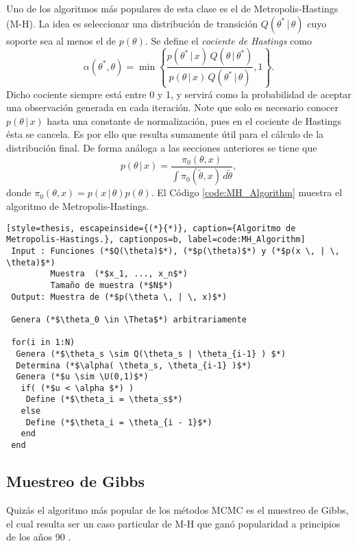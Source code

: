 Uno de los algoritmos más populares de esta clase es el de Metropolis-Hastings (M-H). La idea es seleccionar una distribución de transición $Q( \theta^* \, | \, \theta )$ cuyo soporte sea al menos el de $p(\theta)$. Se define el \textit{cociente de Hastings} como
\begin{equation} \label{eq:cociente_hastings}
	\alpha(\theta^*, \theta) = \min \left\{ \frac{ p(\theta^* \, | \, x) \, Q(\theta \, | \, \theta^*) }{ p(\theta \, | \, x) \, Q(\theta^* \, | \, \theta) }, 1 \right\}.
\end{equation}
Dicho cociente siempre está entre 0 y 1, y servirá como la probabilidad de aceptar una observación generada en cada iteración. Note que solo es necesario conocer $p(\theta \, | \, x)$ hasta una constante de normalización, pues en el cociente de Hastings ésta se cancela. Es por ello que resulta sumamente útil para el cálculo de la distribución final. De forma análoga a las secciones anteriores se tiene que
\begin{equation*}
	p(\theta \, | \, x) = \frac{ \pi_0(\theta, x) }{ \int \pi_0(\tilde{\theta}, x) \, d\tilde{\theta} },
\end{equation*}
donde $\pi_0(\theta, x) = p(x \, | \, \theta) p(\theta)$. El Código \ref{code:MH_Algorithm} muestra el algoritmo de Metropolis-Hastings.




\begin{lstlisting}[style=thesis, escapeinside={(*}{*)}, caption={Algoritmo de Metropolis-Hastings.}, captionpos=b, label=code:MH_Algorithm]
 Input : Funciones (*$Q(\theta)$*), (*$p(\theta)$*) y (*$p(x \, | \, \theta)$*)
         Muestra  (*$x_1, ..., x_n$*)
         Tamaño de muestra (*$N$*)
 Output: Muestra de (*$p(\theta \, | \, x)$*)
 
 Genera (*$\theta_0 \in \Theta$*) arbitrariamente
 
 for(i in 1:N)
  Genera (*$\theta_s \sim Q(\theta_s | \theta_{i-1} ) $*)
  Determina (*$\alpha( \theta_s, \theta_{i-1} )$*)
  Genera (*$u \sim \U(0,1)$*)
   if( (*$u < \alpha $*) )
    Define (*$\theta_i = \theta_s$*)
   else
    Define (*$\theta_i = \theta_{i - 1}$*)
   end
 end
\end{lstlisting}




\subsection{Muestreo de Gibbs}

Quizás el algoritmo más popular de los métodos MCMC es el muestreo de Gibbs, el cual resulta ser un caso particular de M-H que ganó popularidad a principios de los años 90 \citep[ver][]{gelfand_y_smith, geman_y_geman}.\\

